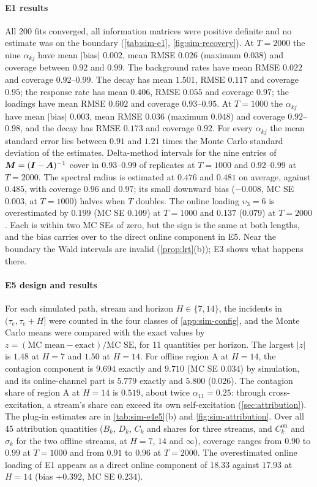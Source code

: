 \paragraph{E1 results} All 200 fits converged, all information matrices were positive
definite and no estimate was on the boundary (\cref{tab:sim-e1}, \cref{fig:sim-recovery}).
At $T=2000$ the nine $\alpha_{kj}$ have mean $|$bias$|$ $0.002$, mean RMSE $0.026$ (maximum
$0.038$) and coverage between $0.92$ and $0.99$. The background rates have mean RMSE
$0.022$ and coverage $0.92$--$0.99$. The decay has mean $1.501$, RMSE $0.117$ and coverage
$0.95$; the response rate has mean $0.406$, RMSE $0.055$ and coverage $0.97$; the loadings
have mean RMSE $0.602$ and coverage $0.93$--$0.95$. At $T=1000$ the $\alpha_{kj}$ have mean
$|$bias$|$ $0.003$, mean RMSE $0.036$ (maximum $0.048$) and coverage $0.92$--$0.98$, and the
decay has RMSE $0.173$ and coverage $0.92$. For every $\alpha_{kj}$ the mean standard error
lies between $0.91$ and $1.21$ times the Monte Carlo standard deviation of the estimates.
Delta-method intervals for the nine entries of $\bm{M}=(\bm{I}-\bm{A})^{-1}$ cover in
$0.93$--$0.99$ of replicates at $T=1000$ and $0.92$--$0.99$ at $T=2000$. The spectral
radius is estimated at $0.476$ and $0.481$ on average, against $0.485$, with coverage $0.96$
and $0.97$; its small downward bias ($-0.008$, MC SE $0.003$, at $T=1000$) halves when $T$
doubles. The online loading $\upsilon_3=6$ is overestimated by $0.199$ (MC SE $0.109$) at
$T=1000$ and $0.137$ ($0.079$) at $T=2000$. Each is within two MC SEs of zero, but the sign
is the same at both lengths, and the bias carries over to the direct online component in
E5. Near the boundary the Wald intervals are invalid (\cref{prop:lrt}(b)); E3 shows what
happens there.

\paragraph{E5 design and results} For each simulated path, stream and horizon
$H\in\{7,14\}$, the incidents in $(\tau_e,\tau_e+H]$ were counted in the four classes of
\cref{app:sim-config}, and the Monte Carlo means were compared with the exact values by
$z=(\text{MC mean}-\text{exact})/\text{MC SE}$, for 11 quantities per horizon. The largest
$|z|$ is $1.48$ at $H=7$ and $1.50$ at $H=14$. For offline region A at $H=14$, the
contagion component is $9.694$ exactly and $9.710$ (MC SE $0.034$) by simulation, and its
online-channel part is $5.779$ exactly and $5.800$ ($0.026$). The contagion share of region
A at $H=14$ is $0.519$, about twice $\alpha_{11}=0.25$: through cross-excitation, a
stream's share can exceed its own self-excitation (\cref{sec:attribution}). The plug-in
estimates are in \cref{tab:sim-e4e5}(b) and \cref{fig:sim-attribution}. Over all 45
attribution quantities ($B_k$, $D_k$, $C_k$ and shares for three streams, and
$C^{\mathrm{on}}_k$ and $\sigma_k$ for the two offline streams, at $H=7$, $14$ and
$\infty$), coverage ranges from $0.90$ to $0.99$ at $T=1000$ and from $0.91$ to $0.96$ at
$T=2000$. The overestimated online loading of E1 appears as a direct online component of
$18.33$ against $17.93$ at $H=14$ (bias $+0.392$, MC SE $0.234$).

